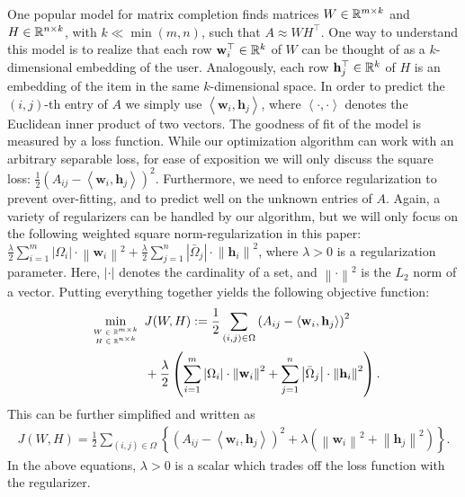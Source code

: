 \documentclass{vldb}
\newcommand{\hb}{\mathbf{h}}
\newcommand{\wb}{\mathbf{w}}
\newcommand{\rbr}[1]{\left(#1\right)}
\newcommand{\cbr}[1]{\left\{#1\right\}}
\newcommand{\nbr}[1]{\left\|#1\right\|}
\newcommand{\abr}[1]{\left|#1\right|}
\newcommand{\inner}[2]{\left\langle #1,#2 \right\rangle}
\newcommand{\Omegabar}{\bar{\Omega}}
\begin{document}
One popular model for matrix completion finds matrices $W \in \mathbb{R}^{m
  \times k}$ and $H \in \mathbb{R}^{n \times k}$, with $k \ll \min(m, n)$, such
that $A \approx W H^{\top}$.  One way to understand this model is to
realize that each row $\wb_{i}^{\top} \in \RR^{k}$ of $W$ can be thought
of as a $k$-dimensional embedding of the user. Analogously, each row
$\hb_{j}^{\top} \in \RR^{k}$ of $H$ is an embedding of the item in the
same $k$-dimensional space. In order to predict the $(i,j)$-th entry of
$A$ we simply use $\inner{\wb_{i}}{\hb_{j}}$, where
$\inner{\cdot}{\cdot}$ denotes the Euclidean inner product of two
vectors. The goodness of fit of the model is measured by a loss
function. While our optimization algorithm can work with an arbitrary
separable loss, for ease of exposition we will only discuss the square
loss: $\frac{1}{2} \rbr{A_{ij} -
  \inner{\wb_{i}}{\hb_{j}}}^{2}$. Furthermore, we need to enforce
regularization to prevent over-fitting, and to predict well on the
unknown entries of $A$. Again, a variety of regularizers can be handled
by our algorithm, but we will only focus on the following weighted
square norm-regularization in this paper: $ \frac \lambda 2
\sum_{i=1}^{m} \abr{\Omega_{i}} \cdot \nbr{\wb_{i}}^{2} + \frac \lambda
2 \sum_{j=1}^{n} \abr{\Omegabar_{j}} \cdot \nbr{\hb_{i}}^{2}$, where
$\lambda > 0$ is a regularization parameter.  Here, $| \cdot |$ denotes
the cardinality of a set, and $\nbr{\cdot}^{2}$ is the $L_2$ norm of a
vector. Putting everything together yields the following objective
function:
\begin{align}
  \label{eq:obj_fcn}
  \min_{
    \tiny{
      \begin{array}{cc}
        W \in \RR^{m \times k} \\
        H \in \RR^{n \times k}
      \end{array}
    }
  }
  & J(W,H) := \frac{1}{2} \sum_{(i,j) \in \Omega}
  \rbr{A_{ij} - \inner{\wb_{i}}{\hb_{j}}}^{2} \nonumber \\
  & + \frac{\lambda}{2} \rbr{ \sum_{i=1}^{m} \abr{\Omega_{i}} \cdot
    \nbr{\wb_{i}}^{2} +
    \sum_{j=1}^{n} \abr{\Omegabar_{j}} \cdot \nbr{\hb_{i}}^{2} }. \end{align}
This can be further simplified and written as 
\begin{align*}
  J(W,H) = \frac{1}{2} \sum_{(i,j) \in \Omega} \cbr{ \rbr{A_{ij} -
      \inner{\wb_{i}}{\hb_{j}}}^2 + \lambda \rbr{\nbr{\wb_{i}}^{2} +
      \nbr{\hb_{j}}^{2}}}.
\end{align*}
In the above equations, $\lambda > 0$ is a scalar which trades off the
loss function with the regularizer.
\end{document}
